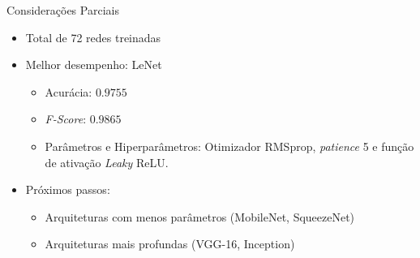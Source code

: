 
\begin{frame}{Considerações Parciais}
  \begin{itemize}
    \item Total de 72 redes treinadas
    \pause
    \bigskip
    \item Melhor desempenho: LeNet
    \begin{itemize}
      \item \alert{Acurácia}: $0.9755$
      \item \alert{\emph{F-Score}}: $0.9865$
      \item \alert{Parâmetros e Hiperparâmetros}: Otimizador RMSprop, \emph{patience} 5 e função de ativação \emph{Leaky} ReLU.
    \end{itemize}
    \pause
    \bigskip
    \item Próximos passos:
    \begin{itemize}
      \item Arquiteturas com menos parâmetros (MobileNet, SqueezeNet)
      \item Arquiteturas mais profundas (VGG-16, Inception)
    \end{itemize}
  \end{itemize}
\end{frame}
